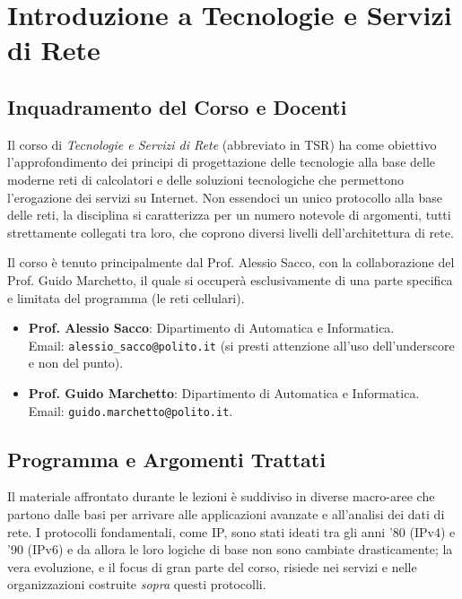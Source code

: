 \chapter{Introduzione a Tecnologie e Servizi di Rete}

\section{Inquadramento del Corso e Docenti}
Il corso di \emph{Tecnologie e Servizi di Rete} (abbreviato in TSR) ha come obiettivo l'approfondimento dei principi di progettazione delle tecnologie alla base delle moderne reti di calcolatori e delle soluzioni tecnologiche che permettono l'erogazione dei servizi su Internet.
Non essendoci un unico protocollo alla base delle reti, la disciplina si caratterizza per un numero notevole di argomenti, tutti strettamente collegati tra loro, che coprono diversi livelli dell'architettura di rete.

Il corso è tenuto principalmente dal Prof. Alessio Sacco, con la collaborazione del Prof. Guido Marchetto, il quale si occuperà esclusivamente di una parte specifica e limitata del programma (le reti cellulari). 

\begin{itemize}
    \item \textbf{Prof. Alessio Sacco}: Dipartimento di Automatica e Informatica. \\ Email: \texttt{alessio\_sacco@polito.it} (si presti attenzione all'uso dell'underscore e non del punto).
    \item \textbf{Prof. Guido Marchetto}: Dipartimento di Automatica e Informatica. \\ Email: \texttt{guido.marchetto@polito.it}.
\end{itemize}

\section{Programma e Argomenti Trattati}
Il materiale affrontato durante le lezioni è suddiviso in diverse macro-aree che partono dalle basi per arrivare alle applicazioni avanzate e all'analisi dei dati di rete. I protocolli fondamentali, come IP, sono stati ideati tra gli anni '80 (IPv4) e '90 (IPv6) e da allora le loro logiche di base non sono cambiate drasticamente; la vera evoluzione, e il focus di gran parte del corso, risiede nei servizi e nelle organizzazioni costruite \emph{sopra} questi protocolli.


